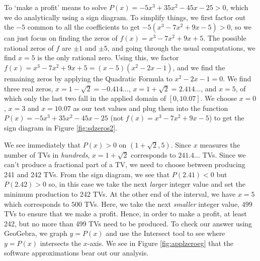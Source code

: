 {To `make a profit' means to solve $P(x) = -5x^3+35x^2-45x-25 > 0$, which we do analytically using a sign diagram.  To simplify things, we first factor out the $-5$ common to all the coefficients to get $-5\left(x^3 - 7x^2+9x-5\right) > 0$, so we can just focus on finding the zeros of $f(x) = x^3-7x^2+9x+5$.  The possible rational zeros of $f$ are $\pm 1$ and $\pm 5$, and going through the usual computations, we find $x=5$ is the only rational zero.  Using this, we factor $f(x) = x^3-7x^2+9x+5 = (x-5) \left(x^2-2x-1\right)$, and we find the remaining zeros by applying the Quadratic Formula to $x^2-2x-1 = 0$.  We find three real zeros,  $x=1-\sqrt{2} = -0.414 \ldots$,  $x = 1+\sqrt{2} = 2.414 \ldots$, and $x = 5$, of which only the last two fall in the applied domain of $[0, 10.07]$.  We choose $x=0$, $x=3$ and $x=10.07$ as our test values and plug them into the function $P(x)=-5x^3+35x^2-45x-25$ (not $f(x) =x^3 - 7x^2+9x-5$) to get the sign diagram in Figure \ref{fig:sdzeros2}.

{}


We see immediately that $P(x)>0$ on $(1+\sqrt{2},5)$.  Since $x$ measures the number of TVs in \textit{hundreds}, $x = 1 + \sqrt{2}$ corresponds to $241.4\ldots$ TVs.  Since we can't produce a fractional part of a TV, we need to choose between producing 241 and 242 TVs.  From the sign diagram, we see that $P(2.41) < 0$ but $P(2.42)>0$ so, in this case we take the next \textit{larger} integer value and set the minimum production to 242 TVs.  At the other end of the interval, we have $x=5$ which corresponds to $500$ TVs.  Here, we take the next \textit{smaller} integer value, $499$ TVs to ensure that we make a profit.  Hence, in order to make a profit, at least 242, but no more than 499 TVs need to be produced.  To check our answer using GeoGebra, we graph $y=P(x)$ and use the Intersect tool to see where $y=P(x)$ intersects the $x$-axis. We see in Figure \ref{fig:applzeroeg} that the software approximations bear out our analysis.
}

{}


